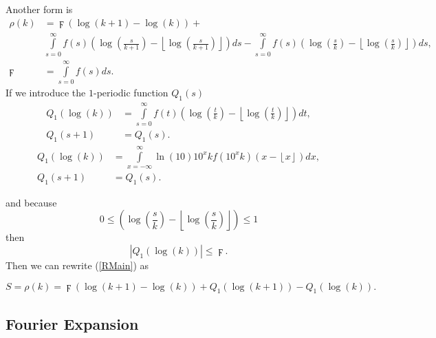 \documentclass[titlepage,fleqn]{article}%
\begin{document}
\bigskip Another form is%
\begin{align}
\rho(k)  &  =\digamma\left(  \log(k+1)-\log(k)\right)  +\label{RMain}\\
&
{\displaystyle\int\limits_{s=0}^{\infty}}
f(s)\left(  \log\left(  \frac{s}{k+1}\right)  -\left\lfloor \log\left(
\frac{s}{k+1}\right)  \right\rfloor \right)  ds-%
{\displaystyle\int\limits_{s=0}^{\infty}}
f(s)\left(  \log\left(  \frac{s}{k}\right)  -\left\lfloor \log\left(  \frac
{s}{k}\right)  \right\rfloor \right)  ds,\nonumber\\
\digamma &  =%
{\displaystyle\int\limits_{s=0}^{\infty}}
f(s)ds.
\end{align}
If we introduce the $1$-periodic function $Q_{1}(s)$
\begin{align}
Q_{1}(\log(k))  &  =%
{\displaystyle\int\limits_{s=0}^{\infty}}
f(t)\left(  \log\left(  \frac{t}{k}\right)  -\left\lfloor \log\left(  \frac
{t}{k}\right)  \right\rfloor \right)  dt,\label{EM7}\\
Q_{1}(s+1)  &  =Q_{1}(s).\nonumber
\end{align}%
\begin{align}
Q_{1}(\log(k))  &  =%
{\displaystyle\int\limits_{x=-\infty}^{\infty}}
\ln(10)10^{x}kf(10^{x}k)\left(  x-\left\lfloor x\right\rfloor \right)  dx,\\
Q_{1}(s+1)  &  =Q_{1}(s).\nonumber
\end{align}


\noindent and because%
\[
0\leq\left(  \log\left(  \frac{s}{k}\right)  -\left\lfloor \log\left(
\frac{s}{k}\right)  \right\rfloor \right)  \leq1
\]
then%
\[
\left\vert Q_{1}(\log(k))\right\vert \leq\digamma.
\]
Then we can rewrite (\ref{RMain}) as%

\begin{equation}
S=\rho(k)=\digamma\left(  \log\left(  k+1\right)  -\log\left(  k\right)
\right)  +Q_{1}(\log(k+1))-Q_{1}(\log(k)). \label{MainEM0}%
\end{equation}


\subsection{Fourier Expansion}
\end{document}
